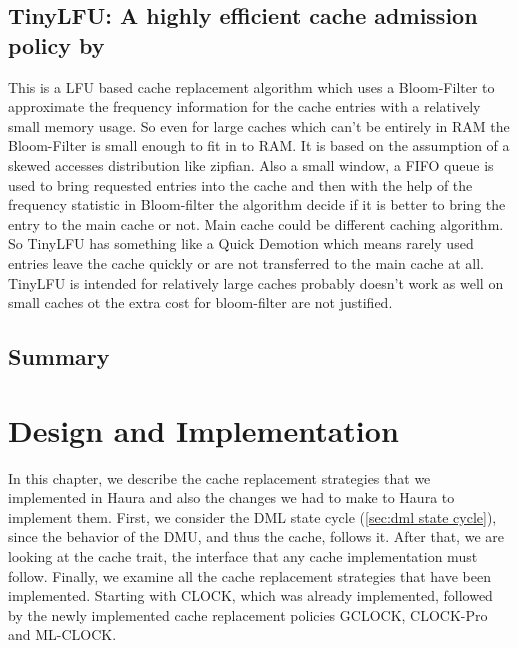 \documentclass[
	12pt,
	a4paper,
	abstract,
	bibliography=totoc,
	chapterprefix,
	headings=openright,
	numbers=endperiod,
	parskip=half,
	twoside,
]{scrreprt}
\begin{document}
\section*{TinyLFU: A highly efficient cache admission policy by \cite{einziger2017tinylfu}}

This is a LFU based cache replacement algorithm which uses a Bloom-Filter to approximate the frequency information for the cache entries with a relatively small memory usage.
So even for large caches which can't be entirely in RAM the Bloom-Filter is small enough to fit in to RAM.
It is based on the assumption of a skewed accesses distribution like zipfian.
Also a small window, a FIFO queue is used to bring requested entries into the cache and then
with the help of the frequency statistic in Bloom-filter the algorithm decide if it is better to bring the entry to the main cache or not. Main cache could be different caching algorithm.
So TinyLFU has something like a Quick Demotion which means rarely used entries leave the cache quickly or are not transferred to the main cache at all.
TinyLFU is intended for relatively large caches probably doesn't work as well on small caches ot the extra cost for bloom-filter are not justified.


\section*{Summary}

\chapter{Design and Implementation}
\label{cha:design and implementation}


In this chapter, we describe the cache replacement strategies that we implemented in Haura 
and also the changes we had to make to Haura to implement them.
First, we consider the DML state cycle (\cref{sec:dml state cycle}), 
since the behavior of the DMU, and thus the cache, follows it.
After that, we are looking at the cache trait, the interface that any cache implementation must follow.
Finally, we examine all the cache replacement strategies that have been implemented.
Starting with CLOCK, which was already implemented,
followed by the newly implemented cache replacement policies GCLOCK, CLOCK-Pro and ML-CLOCK.
\end{document}
